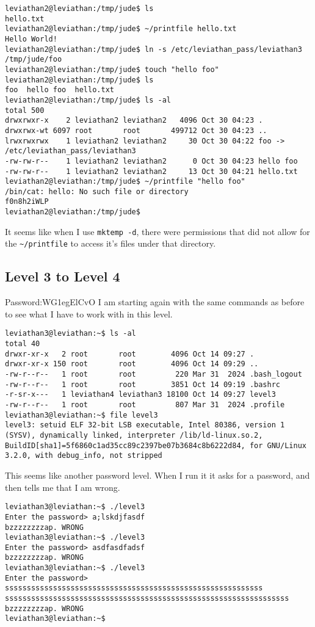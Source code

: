 \documentclass[11pt]{article}
\begin{document}
\begin{lstlisting}
leviathan2@leviathan:/tmp/jude$ ls
hello.txt
leviathan2@leviathan:/tmp/jude$ ~/printfile hello.txt
Hello World!
leviathan2@leviathan:/tmp/jude$ ln -s /etc/leviathan_pass/leviathan3 /tmp/jude/foo
leviathan2@leviathan:/tmp/jude$ touch "hello foo"
leviathan2@leviathan:/tmp/jude$ ls
foo  hello foo  hello.txt
leviathan2@leviathan:/tmp/jude$ ls -al
total 500
drwxrwxr-x    2 leviathan2 leviathan2   4096 Oct 30 04:23 .
drwxrwx-wt 6097 root       root       499712 Oct 30 04:23 ..
lrwxrwxrwx    1 leviathan2 leviathan2     30 Oct 30 04:22 foo -> /etc/leviathan_pass/leviathan3
-rw-rw-r--    1 leviathan2 leviathan2      0 Oct 30 04:23 hello foo
-rw-rw-r--    1 leviathan2 leviathan2     13 Oct 30 04:21 hello.txt
leviathan2@leviathan:/tmp/jude$ ~/printfile "hello foo"
/bin/cat: hello: No such file or directory
f0n8h2iWLP
leviathan2@leviathan:/tmp/jude$
\end{lstlisting}

It seems like when I use \verb|mktemp -d|, there were permissions that did not allow for the \verb|~/printfile| to access it's files under that directory. 


\subsection*{Level 3 to Level 4}
Password:WG1egElCvO
I am starting again with the same commands as before to see what I have to work with in this level. 

\begin{lstlisting}
leviathan3@leviathan:~$ ls -al
total 40
drwxr-xr-x   2 root       root        4096 Oct 14 09:27 .
drwxr-xr-x 150 root       root        4096 Oct 14 09:29 ..
-rw-r--r--   1 root       root         220 Mar 31  2024 .bash_logout
-rw-r--r--   1 root       root        3851 Oct 14 09:19 .bashrc
-r-sr-x---   1 leviathan4 leviathan3 18100 Oct 14 09:27 level3
-rw-r--r--   1 root       root         807 Mar 31  2024 .profile
leviathan3@leviathan:~$ file level3
level3: setuid ELF 32-bit LSB executable, Intel 80386, version 1 (SYSV), dynamically linked, interpreter /lib/ld-linux.so.2, BuildID[sha1]=5f6860c1ad35cc89c2397be07b3684c8b6222d84, for GNU/Linux 3.2.0, with debug_info, not stripped
\end{lstlisting}

This seems like another password level. When I run it it asks for a password, and then tells me that I am wrong. 

\begin{lstlisting}
leviathan3@leviathan:~$ ./level3
Enter the password> a;lskdjfasdf
bzzzzzzzzap. WRONG
leviathan3@leviathan:~$ ./level3
Enter the password> asdfasdfadsf
bzzzzzzzzap. WRONG
leviathan3@leviathan:~$ ./level3
Enter the password> sssssssssssssssssssssssssssssssssssssssssssssssssssssssssss
sssssssssssssssssssssssssssssssssssssssssssssssssssssssssssssssss
bzzzzzzzzap. WRONG
leviathan3@leviathan:~$
\end{lstlisting}
\end{document}
